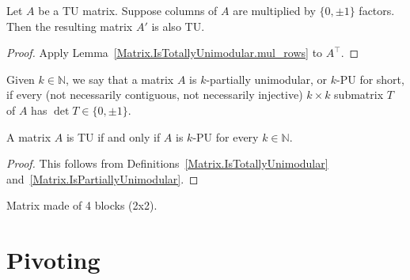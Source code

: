 \begin{lemma}
    \label{Matrix.IsTotallyUnimodular.mul_cols}
    \leanok
    Let $A$ be a TU matrix. Suppose columns of $A$ are multiplied by $\{0, \pm 1\}$ factors. Then the resulting matrix $A'$ is also TU.
\end{lemma}

\begin{proof}
    \leanok
    Apply Lemma~\ref{Matrix.IsTotallyUnimodular.mul_rows} to $A^{\top}$.
\end{proof}

\begin{definition}
    \label{Matrix.IsPartiallyUnimodular}
    \leanok
    Given $k \in \mathbb{N}$, we say that a matrix $A$ is $k$-partially unimodular, or $k$-PU for short, if every (not necessarily contiguous, not necessarily injective) $k \times k$ submatrix $T$ of $A$ has $\det T \in \{0, \pm 1\}$.
\end{definition}

\begin{lemma}
    \label{Matrix.isTotallyUnimodular_iff_forall_isPartiallyUnimodular}
    \leanok
    A matrix $A$ is TU if and only if $A$ is $k$-PU for every $k \in \mathbb{N}$.
\end{lemma}

\begin{proof}
    \leanok
    This follows from Definitions~\ref{Matrix.IsTotallyUnimodular} and~\ref{Matrix.IsPartiallyUnimodular}.
\end{proof}

\begin{definition}
    \label{Matrix.fromBlocks}
    \leanok
    Matrix made of 4 blocks (2x2).
\end{definition}

\section{Pivoting}


